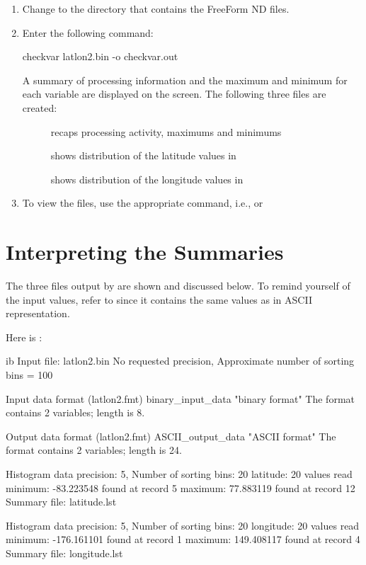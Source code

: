 \begin{enumerate}
\item Change to the directory that contains the FreeForm ND files. 

\item Enter the following command: 

checkvar latlon2.bin -o checkvar.out 

A summary of processing information and the maximum and minimum for each variable are displayed on the screen. The following three files are created: 

\begin{description}
\item[] recaps processing activity, maximums and
  minimums
  
\item[] shows distribution of the latitude values in
  
\item[] shows distribution of the longitude values
  in 
\end{description}

\item To view the files, use the appropriate command, i.e., 
  or 
\end{enumerate}

\section{Interpreting the Summaries}

The three files output by  are shown and discussed
below. To remind yourself of the input values, refer to
 since it contains the same values as
 in ASCII representation.

Here is :

\begin{vcode}{ib}
Input file: latlon2.bin
No requested precision, Approximate number of sorting bins = 100

Input data format       (latlon2.fmt)
binary_input_data       "binary format"
The format contains 2 variables; length is 8.

Output data format       (latlon2.fmt)
ASCII_output_data       "ASCII format"
The format contains 2 variables; length is 24.

Histogram data precision: 5, Number of sorting bins: 20
latitude: 20 values read
minimum: -83.223548 found at record 5
maximum:  77.883119 found at record 12
Summary file: latitude.lst

Histogram data precision: 5, Number of sorting bins: 20
longitude: 20 values read
minimum: -176.161101 found at record 1
maximum:  149.408117 found at record 4
Summary file: longitude.lst
\end{vcode}


